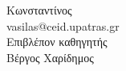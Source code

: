 \begin{titlepage}

    \begin{center}
         Κωνσταντίνος\\
        vasilas@ceid.upatras.gr\\[3cm]
        
        Επιβλέπον καθηγητής\\
        Βέργος Χαρίδημος
    \end{center}
	 
	
	
\end{titlepage}




	

 	
 	
 	



	
